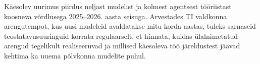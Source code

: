 Käesolev uurimus piirdus neljast mudelist ja kolmest agentsest tööriistast koosneva võrdlusega 2025--2026. aasta seisuga. Arvestades TI valdkonna arengutempot, kus uusi mudeleid avaldatakse mitu korda aastas, tuleks sarnaseid teostatavusuuringuid korrata regulaarselt, et hinnata, kuidas ülalnimetatud arengud tegelikult realiseeruvad ja millised käesoleva töö järeldustest jäävad kehtima ka uuema põlvkonna mudelite puhul.

